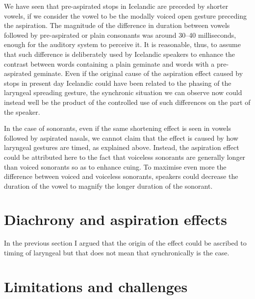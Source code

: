 \documentclass[11pt,a4paper,openany]{memoir}\usepackage[]{graphicx}\usepackage[]{color}
\begin{document}
We have seen that pre-aspirated stops in Icelandic are preceded by shorter vowels, if we consider the vowel to be the modally voiced open gesture preceding the aspiration.
The magnitude of the difference in duration between vowels followed by pre-aspirated or plain consonants was around 30--40 milliseconds, enough for the auditory system to perceive it.
It is reasonable, thus, to assume that such difference is deliberately used by Icelandic speakers to enhance the contrast between words containing a plain geminate and words with a pre-aspirated geminate.
Even if the original cause of the aspiration effect caused by stops in present day Icelandic could have been related to the phasing of the laryngeal spreading gesture, the synchronic situation we can observe now could instead well be the product of the controlled use of such differences on the part of the speaker.

In the case of sonorants, even if the same shortening effect is seen in vowels followed by aspirated nasals, we cannot claim that the effect is caused by how laryngeal gestures are timed, as explained above.
Instead, the aspiration effect could be attributed here to the fact that voiceless sonorants are generally longer than voiced sonorants so as to enhance cuing.
To maximise even more the difference between voiced and voiceless sonorants, speakers could decrease the duration of the vowel to magnify the longer duration of the sonorant.




\section{Diachrony and aspiration effects}
In the previous section I argued that the origin of the effect could be ascribed to timing of laryngeal but that does not mean that synchronically is the case.


\section{Limitations and challenges}
\end{document}
